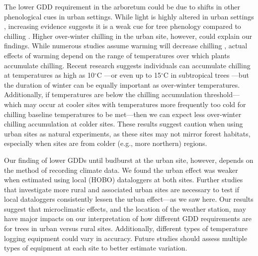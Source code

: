 \documentclass{article}\usepackage[]{graphicx}\usepackage[]{color}
\begin{document}
The lower GDD requirement in the arboretum could be due to shifts in other phenological cues in urban settings. While light is highly altered in urban settings \citep{Jochner2015}, increasing evidence suggests it is a weak cue for tree phenology compared to chilling \citep{Ettinger2020}. Higher over-winter chilling in the urban site, however, could explain our findings. While numerous studies assume warming will decrease chilling \citep{Luedeling2011,Fu2015,Asse2018}, actual effects of warming depend on the range of temperatures over which plants accumulate chilling. Recent research suggests individuals can accumulate chilling at temperatures as high as 10$^{\circ}$C \citep{Baumgarten2021}---or even up to 15$^{\circ}$C in subtropical trees \citep{Zhang2021}---but the duration of winter can be equally important as over-winter temperatures. Additionally, if temperatures are below the chilling accumulation threshold---which may occur at cooler sites with temperatures more frequently too cold for chilling baseline temperatures to be met---then we can expect less over-winter chilling accumulation at colder sites. These results suggest caution when using urban sites as natural experiments, as these sites may not mirror forest habitats, especially when sites are from colder (e.g., more northern) regions. 

Our finding of lower GDDs until budburst at the urban site, however, depends on the method of recording climate data. We found the urban effect was weaker when estimated using local (HOBO) dataloggers at both sites. Further studies that investigate more rural and associated urban sites are necessary to test if local dataloggers consistently lessen the urban effect---as we saw here. Our results suggest that microclimatic effects, and the location of the weather station, may have major impacts on our interpretation of how different GDD requirements are for trees in urban versus rural sites. Additionally, different types of temperature logging equipment could vary in accuracy. Future studies should assess multiple types of equipment at each site to better estimate variation. 
\end{document}
